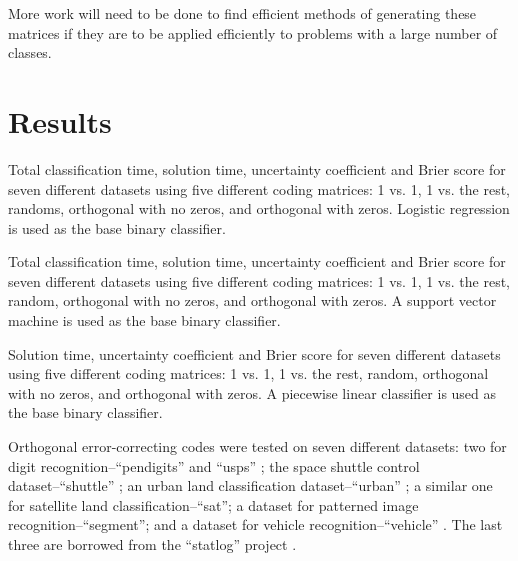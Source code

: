 More work will need to be done to find efficient methods
of generating these matrices
if they are to be applied efficiently to problems with a large number of classes.


\section{Results}

\begin{table*}
{\revision
\caption{Total classification time, solution time, uncertainty coefficient and Brier score for seven different datasets using five different coding matrices: 1 vs. 1, 1 vs. the rest, randoms, orthogonal with no zeros, and orthogonal with zeros. Logistic regression is used as the base binary classifier.}\label{class_results_lin}

	}
\end{table*}

\begin{table*}
{\revision
\caption{Total classification time, solution time, uncertainty coefficient and Brier score for seven different datasets using five different coding matrices: 1 vs. 1, 1 vs. the rest, random, orthogonal with no zeros, and orthogonal with zeros. A support vector machine is used as the base binary classifier.}\label{class_results_svm}
	}
\end{table*}

\begin{table*}
{\revision
\caption{Solution time, uncertainty coefficient and Brier score for seven different datasets using five different coding matrices: 1 vs. 1, 1 vs. the rest, random, orthogonal with no zeros, and orthogonal with zeros. A piecewise linear classifier is used as the base binary classifier.}\label{class_results_acc}
	}
\end{table*}

Orthogonal error-correcting codes were tested on 
{\revision seven} different datasets:
two for digit recognition--``pendigits'' \citep{Alimoglu1996} and
``usps'' \citep{Hull1994}; the space shuttle control dataset--``shuttle''
\citep{King_etal1995}; 
{\revision an urban land classification dataset--``urban'' \citep{Johnson2013};}
a similar one for satellite land classification--``sat''; 
a dataset for patterned image recognition--``segment'';
and a dataset for vehicle recognition--``vehicle'' \citep{Siebert1987}.
The last three are borrowed from the ``statlog'' project \citep{King_etal1995,Michie_etal1994}.

